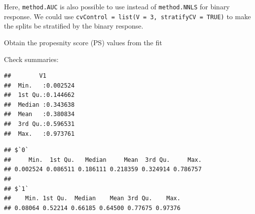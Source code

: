 \documentclass[
]{book}
\newenvironment{Shaded}{\begin{snugshade}}{\end{snugshade}}
\newcommand{\AttributeTok}[1]{\textcolor[rgb]{0.77,0.63,0.00}{#1}}
\newcommand{\FunctionTok}[1]{\textcolor[rgb]{0.00,0.00,0.00}{#1}}
\newcommand{\NormalTok}[1]{#1}
\newcommand{\OtherTok}[1]{\textcolor[rgb]{0.56,0.35,0.01}{#1}}
\newcommand{\SpecialCharTok}[1]{\textcolor[rgb]{0.00,0.00,0.00}{#1}}
\newcommand{\StringTok}[1]{\textcolor[rgb]{0.31,0.60,0.02}{#1}}
\begin{document}
Here, \texttt{method.AUC} is also possible to use instead of \texttt{method.NNLS} for binary response. We could use \texttt{cvControl\ =\ list(V\ =\ 3,\ stratifyCV\ =\ TRUE)} to make the splits be stratified by the binary response.

Obtain the propesnity score (PS) values from the fit

\begin{Shaded}
\end{Shaded}

Check summaries:

\begin{Shaded}
\end{Shaded}

\begin{verbatim}
##        V1          
##  Min.   :0.002524  
##  1st Qu.:0.144662  
##  Median :0.343638  
##  Mean   :0.380834  
##  3rd Qu.:0.596531  
##  Max.   :0.973761
\end{verbatim}

\begin{Shaded}
\end{Shaded}

\begin{verbatim}
## $`0`
##     Min.  1st Qu.   Median     Mean  3rd Qu.     Max. 
## 0.002524 0.086511 0.186111 0.218359 0.324914 0.786757 
## 
## $`1`
##    Min. 1st Qu.  Median    Mean 3rd Qu.    Max. 
## 0.08064 0.52214 0.66185 0.64500 0.77675 0.97376
\end{verbatim}
\end{document}
